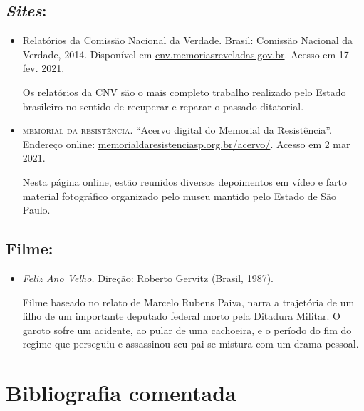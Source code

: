 \documentclass[12pt]{extarticle}
\begin{document}
\subsection{\emph{Sites}:}

\begin{itemize}
\item Relatórios da Comissão Nacional da Verdade. Brasil: Comissão
Nacional da Verdade, 2014. Disponível em
\href{http://cnv.memoriasreveladas.gov.br/}{{cnv.memoriasreveladas.gov.br}}.
Acesso em 17 fev. 2021.

Os relatórios da CNV são o mais completo trabalho realizado pelo Estado
brasileiro no sentido de recuperar e reparar o passado ditatorial.

\item \textsc{memorial da resistência}. ``Acervo digital do Memorial da Resistência''. Endereço online: \href{http://http://memorialdaresistenciasp.org.br/acervo/}{{memorialdaresistenciasp.org.br/acervo/}}.
Acesso em 2 mar 2021.

Nesta página online, estão reunidos diversos depoimentos em vídeo e farto material fotográfico organizado pelo museu mantido pelo Estado de São Paulo.
\end{itemize}

\subsection{Filme:}

\begin{itemize}
\item\emph{Feliz Ano Velho.} Direção: Roberto Gervitz (Brasil, 1987). 

Filme baseado no relato de Marcelo Rubens Paiva, narra a trajetória de um filho de um importante deputado federal morto pela Ditadura Militar. O garoto sofre um acidente, ao pular de uma cachoeira, e o período do fim do regime que perseguiu e assassinou seu pai se mistura com um drama pessoal. 
\end{itemize}

\section{Bibliografia comentada}
\end{document}
